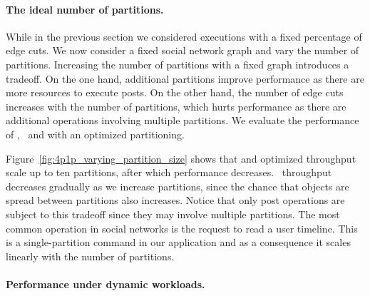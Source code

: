 \paragraph*{The ideal number of partitions.}
\label{sec:evaluation:results}

While in the previous section we considered executions with a fixed percentage of edge cuts.
We now consider a fixed social network graph and vary the number of partitions.
Increasing the number of partitions with a fixed graph introduces a tradeoff.
On the one hand, additional partitions improve performance as there are more resources to execute posts.
On the other hand, the number of edge cuts increases with the number of partitions, which hurts performance as there are additional operations involving multiple partitions.
We evaluate the performance of \dynastar, \dssmr\ and \ssmr with an optimized partitioning.%


Figure~\ref{fig:4p1p_varying_partition_size} shows that \dynastar and optimized \ssmr throughput scale up to ten partitions, after which performance decreases. \dssmr\ throughput decreases gradually as we increase partitions, since the chance that objects are spread between partitions also increases.
Notice that only post operations are subject to this tradeoff since they may involve multiple partitions.
The most common operation in social networks is the request to read a user timeline. This is a single-partition
command in our application and as a consequence it scales linearly with the number of partitions.


\paragraph*{Performance under dynamic workloads.}

